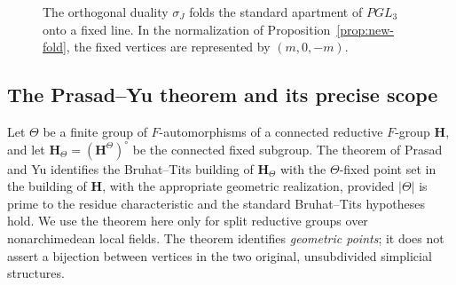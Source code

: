 \documentclass[12pt,letterpaper]{amsart}
\numberwithin{equation}{section}
\theoremstyle{definition}
\theoremstyle{plain}
\begin{document}
\begin{figure}[htbp]
\centering
{}
\caption{The orthogonal duality $\sigma_J$ folds the standard apartment of $PGL_3$ onto a fixed line. In the normalization of Proposition~\ref{prop:new-fold}, the fixed vertices are represented by $(m,0,-m)$.\label{fig:new-folded-apartment}}
\end{figure}

\subsection{The Prasad--Yu theorem and its precise scope}
Let $\Theta$ be a finite group of $F$-automorphisms of a connected
reductive $F$-group $\mathbf H$, and let
$\mathbf H_\Theta=(\mathbf H^\Theta)^\circ$ be the connected fixed
subgroup. The theorem of Prasad and Yu \cite[Theorem~1.9]{PY02}
identifies the Bruhat--Tits building of $\mathbf H_\Theta$ with the
$\Theta$-fixed point set in the building of $\mathbf H$, with the
appropriate geometric realization, provided $|\Theta|$ is prime to
the residue characteristic and the standard Bruhat--Tits hypotheses
hold. We use the theorem here only for split reductive groups over
nonarchimedean local fields. The theorem identifies \emph{geometric
points}; it does not assert a bijection between vertices in the two
original, unsubdivided simplicial structures.
\end{document}
